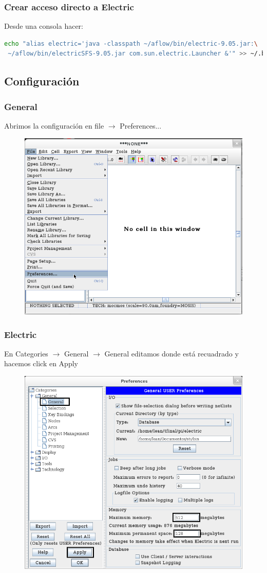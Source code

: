 \documentclass{beamer}
\begin{document}
\begin{frame}[fragile]
\frametitle{Crear acceso directo a Electric}
Desde una consola hacer:
\begin{tiny}
\begin{lstlisting}[language=bash]
 echo "alias electric='java -classpath ~/aflow/bin/electric-9.05.jar:\
 ~/aflow/bin/electricSFS-9.05.jar com.sun.electric.Launcher &'" >> ~/.bashrc
\end{lstlisting}

\end{tiny}

\end{frame}

\begin{frame}[fragile]
\section{Configuración}
\frametitle{General}

\noindent Abrimos la configuración en file $\rightarrow$ Preferences...

\begin{figure}
\includegraphics[width=0.6\linewidth]{figuras/configuracionElectric-1.png}
\end{figure}
\end{frame}


\begin{frame}
\frametitle{Electric}

\noindent En Categories $\rightarrow$ General $\rightarrow$ General editamos donde está recuadrado y hacemos click en Apply 

\begin{figure}
\includegraphics[width=0.55\linewidth]{figuras/configuracionElectric-2.png}
\end{figure}
\end{frame}
\end{document}
